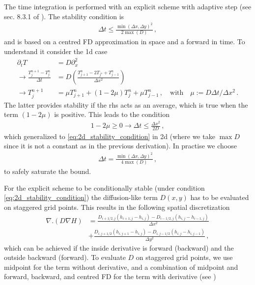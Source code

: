 \documentclass[11pt,a4paper]{article}
\newcommand{\p}{\partial}
\begin{document}
The time integration is performed with an explicit scheme with adaptive step (see sec. 8.3.1 of \cite{karthaus_notes}). The stability condition is 
\begin{align}
    \Delta t \leq \frac{\min(\Delta x, \Delta y)^2}{2 \max(D)}
    \,,
    \label{eq:2d_stability_condition}
\end{align}
and is based on a centred FD approximation in space and a forward in time. To understand it consider the 1d case
\begin{align*}
    \p_t T &= D \p_x^2 
    \\
    \rightarrow
    \frac{T_j^{n+1} - T_j^n}{\Delta t} 
    & = D \left( \frac{T_{j+1}^n - 2 T_{j^n} + T_{j-1}^n}{\Delta x^2} \right)
    \\
    \rightarrow
    T_j^{n+1} & = \mu T_{j+1}^n + \left(1 - 2 \mu \right) T_j^n + \mu T_{j-1}^n
    \,, \quad \text{with} \quad \mu:= D \Delta t / \Delta x^2
    \,.
\end{align*}
The latter provides stability if the rhs acts as an average, which is true when the term $(1-2\mu)$ is positive. This leads to the condition
\begin{align*}
    1-2\mu \geq 0 \rightarrow \Delta t \leq \frac{\Delta x^2}{2 D}
    \,,
\end{align*}
which generalized to \eqref{eq:2d_stability_condition} in 2d (where we take $\max{D}$ since it is not a constant as in the previous derivation). In practise we choose
\begin{align*}
    \Delta t = \frac{\min(\Delta x, \Delta y)^2}{4 \max(D)}
    \,,
\end{align*}
to safely saturate the bound.

For the explicit scheme to be conditionally stable (under condition \eqref{eq:2d_stability_condition}) the diffusion-like term $D(x,y)$ has to be evaluated on staggered grid points. This results in the following spatial discretization
\begin{align}
    \nabla . \left(D \nabla H \right) 
    &= 
    \frac{D_{i+1/2,j} (h_{i+1,j}-h_{i,j}) - D_{i-1/2,j}(h_{i,j}-h_{i-1,j})}{\Delta x^2}
    \nonumber
    \\
    & + 
    \frac{D_{i,j+1/2} (h_{i,j+1}-h_{i,j}) - D_{i,j-1/2}(h_{i,j}-h_{i,j-1})}{\Delta y^2}
    \,, 
    \label{eq:bueler_stencil}
\end{align}
which can be achieved if the inside derivative is forward (backward) and the outside backward (forward). To evaluate $D$ on staggered grid points, we use midpoint for the term without derivative, and a combination of midpoint and forward, backward, and centred FD for the term with derivative (see \cite{Karthaus_mfiles})
\end{document}
